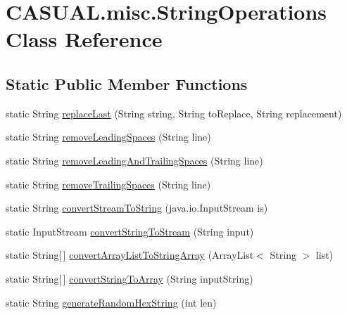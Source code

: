 \hypertarget{class_c_a_s_u_a_l_1_1misc_1_1_string_operations}{\section{C\-A\-S\-U\-A\-L.\-misc.\-String\-Operations Class Reference}
\label{class_c_a_s_u_a_l_1_1misc_1_1_string_operations}
}
\subsection*{Static Public Member Functions}
\begin{DoxyCompactItemize}
\item 
static String \hyperlink{class_c_a_s_u_a_l_1_1misc_1_1_string_operations_a2ca54978e1c7207cfc2a5a5526c26e48}{replace\-Last} (String string, String to\-Replace, String replacement)
\item 
static String \hyperlink{class_c_a_s_u_a_l_1_1misc_1_1_string_operations_a917dd1b4316d383992c5eba6c0960934}{remove\-Leading\-Spaces} (String line)
\item 
static String \hyperlink{class_c_a_s_u_a_l_1_1misc_1_1_string_operations_a9e737d317a79c13c3c9ae279fd6c26a8}{remove\-Leading\-And\-Trailing\-Spaces} (String line)
\item 
static String \hyperlink{class_c_a_s_u_a_l_1_1misc_1_1_string_operations_a6e73c975bfeec0c3737203043c72190b}{remove\-Trailing\-Spaces} (String line)
\item 
static String \hyperlink{class_c_a_s_u_a_l_1_1misc_1_1_string_operations_ac656345120c52916e47e2d24f62a8d73}{convert\-Stream\-To\-String} (java.\-io.\-Input\-Stream is)
\item 
static Input\-Stream \hyperlink{class_c_a_s_u_a_l_1_1misc_1_1_string_operations_a813e85c2bd5595496dc70c336d045e53}{convert\-String\-To\-Stream} (String input)
\item 
static String\mbox{[}$\,$\mbox{]} \hyperlink{class_c_a_s_u_a_l_1_1misc_1_1_string_operations_ad37eeeaf74afa6c537486c4103ac07ab}{convert\-Array\-List\-To\-String\-Array} (Array\-List$<$ String $>$ list)
\item 
static String\mbox{[}$\,$\mbox{]} \hyperlink{class_c_a_s_u_a_l_1_1misc_1_1_string_operations_a20b27a70d8a3a625c27001f6a072bf8d}{convert\-String\-To\-Array} (String input\-String)
\item 
static String \hyperlink{class_c_a_s_u_a_l_1_1misc_1_1_string_operations_ad287e81ccf48546cd49738824cbb1a25}{generate\-Random\-Hex\-String} (int len)

\end{DoxyCompactItemize}
